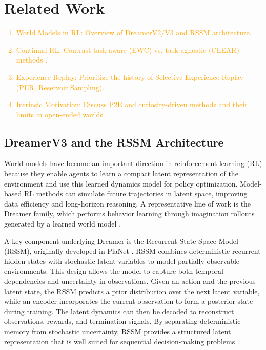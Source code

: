 \documentclass{article}
\begin{document}
\section{Related Work}
\label{sec:related_work}

\textcolor{orange}{
\begin{enumerate}
    \item World Models in RL: Overview of DreamerV2/V3 and RSSM architecture.
    \item Continual RL: Contrast task-aware (EWC) vs. task-agnostic (CLEAR) methods .
    \item Experience Replay: Prioritize the history of Selective Experience Replay (PER, Reservoir Sampling).
    \item Intrinsic Motivation: Discuss P2E and curiosity-driven methods and their limits in open-ended worlds.
\end{enumerate}
}
\subsection{DreamerV3 and the RSSM Architecture}
World models have become an important direction in reinforcement learning (RL) because they enable agents to learn a compact latent representation of the environment and use this learned dynamics model for policy optimization. Model-based RL methods can simulate future trajectories in latent space, improving data efficiency and long-horizon reasoning. A representative line of work is the Dreamer family, which performs behavior learning through imagination rollouts generated by a learned world model \cite{hafner2019dream,hafner2023mastering}.

A key component underlying Dreamer is the Recurrent State-Space Model (RSSM), originally developed in PlaNet \cite{hafner2019learning}. RSSM combines deterministic recurrent hidden states with stochastic latent variables to model partially observable environments. This design allows the model to capture both temporal dependencies and uncertainty in observations. Given an action and the previous latent state, the RSSM predicts a prior distribution over the next latent variable, while an encoder incorporates the current observation to form a posterior state during training. The latent dynamics can then be decoded to reconstruct observations, rewards, and termination signals. By separating deterministic memory from stochastic uncertainty, RSSM provides a structured latent representation that is well suited for sequential decision-making problems \cite{hafner2019learning}.
\end{document}
